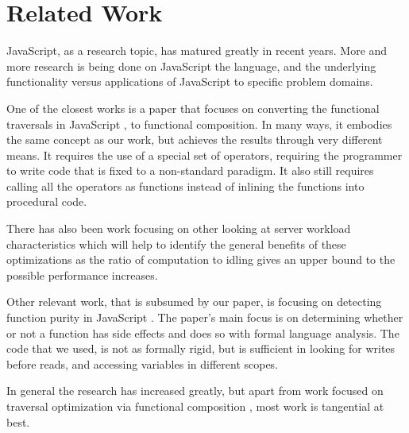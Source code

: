 \chapter{Related Work}

JavaScript, as a research topic, has matured greatly in recent years.  More and more research is being done on JavaScript the language, and the underlying functionality versus applications of JavaScript to specific problem domains.

One of the closest works is a paper that focuses on converting the functional traversals in JavaScript \cite{jscomb}, to functional composition.  In many ways, it embodies the same concept as our work, but achieves the results through very different means.  It requires the use of a special set of operators, requiring the programmer to write code that is fixed to a non-standard paradigm. It also still requires calling all the operators as functions instead of inlining the functions into procedural code.

There has also been work focusing on other looking at server workload characteristics \cite{TODO} which will help to identify the general benefits of these optimizations as the ratio of computation to idling gives an upper bound to the possible performance increases.

Other relevant work, that is subsumed by our paper, is focusing on detecting function purity in JavaScript \cite{TODO}.  The paper's main focus is on determining whether or not a function has side effects and does so with formal language analysis.  The code that we used, is not as formally rigid, but is sufficient in looking for writes before reads, and accessing variables in different scopes.  

In general the research has increased greatly, but apart from work focused on traversal optimization via functional composition \cite{jscomb}, most work is tangential at best.